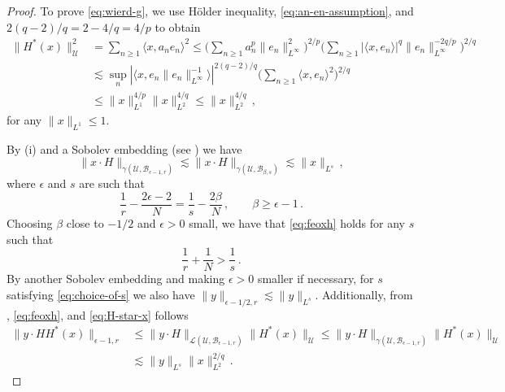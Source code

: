 \documentclass[final]{amsart}
\numberwithin{thm}{section}
\numberwithin{equation}{section}
\newcommand{\U}{\mathcal{U}}
\newcommand{\ip}[2]{\langle #1, #2 \rangle}
\newcommand{\B}{\mathcal{B}}
\begin{document}
\begin{proof}
To prove \eqref{eq:wierd-g}, we use H\" older inequality, \eqref{eq:an-en-assumption}, and $2(q-2)/q = 2-4/q = 4/p$ to obtain
\begin{equation}\label{eq:H-star-x}
    \begin{aligned}
    \|H^*(x)\|_\U^2 &= \sum_{n \geq 1} \ip{x}{a_ne_n}^2 \leq \Big(\sum_{n \geq 1}a_n^p\|e_n\|_{L^\infty}^2\Big)^{2/p}\Big(\sum_{n\geq 1} |\ip{x}{e_n}|^q\|e_n\|_{L^\infty}^{-2q/p}\Big)^{2/q} \\
    &\lesssim \sup_n |\ip{x}{e_n\|e_n\|_{L^\infty}^{-1}}|^{2(q-2)/q}\Big(\sum_{n \geq1} \ip{x}{e_n}^2\Big)^{2/q} \\
    &\leq \|x\|_{L^1}^{4/p}\|x\|_{L^2}^{4/q} \leq \|x\|_{L^2}^{4/q}\,,
\end{aligned}
\end{equation}
for any $\|x\|_{L^1} \leq 1$.


By (i) and a Sobolev embedding (see ) we have
\begin{equation}\label{eq:feoxh}
\|x\cdot H\|_{\gamma(\U,\B_{\epsilon-1,r})} \lesssim \|x \cdot H\|_{\gamma(\U,\B_{\beta,s})} \lesssim \|x\|_{L^s} \,,
\end{equation}
where $\epsilon$ and $s$ are such that
$$
\frac{1}{r} - \frac{2\epsilon - 2}{N} = \frac{1}{s} - \frac{2\beta}{N}\,, \qquad \beta \geq \epsilon - 1 \,.
$$
Choosing $\beta$ close to $-1/2$ and $\epsilon > 0$ small, we have that \eqref{eq:feoxh} holds for any $s$ such that
\begin{equation}\label{eq:choice-of-s}
\frac{1}{r} + \frac{1}{N} > \frac{1}{s} \,.
\end{equation}
By another Sobolev embedding and making $\epsilon > 0$ smaller if necessary, for $s$ satisfying \eqref{eq:choice-of-s} we also have $\|y\|_{\epsilon-1/2,r} \lesssim \|y\|_{L^s}$.
Additionally, from , \eqref{eq:feoxh}, and \eqref{eq:H-star-x} follows
\begin{align*}
 \|y\cdot H H^*(x)\|_{\epsilon-1,r} &\leq 
 \|y\cdot H\|_{\mathcal{L}(\U,\B_{\epsilon-1,r})} \|H^*(x)\|_{\U}
 \leq \|y\cdot H\|_{\gamma(\U,\B_{\epsilon-1,r})} \|H^*(x)\|_{\U}
 \\
 &\lesssim \|y\|_{L^s}\|x\|_{L^2}^{2/q} \,.
\end{align*}


\end{proof}
\end{document}
